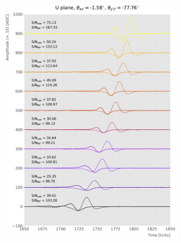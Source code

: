 \begin{figure}[t]
	\begin{subfigure}{0.5\textwidth}
		\centering
		\includegraphics[width=.99\linewidth]{Images/Matched_Filter/evt_xz_0_yz_90_U}
	\end{subfigure}
	\begin{subfigure}{0.5\textwidth}
		\centering

\end{subfigure}
\end{figure}
